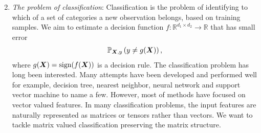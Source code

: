 \documentclass[12pt]{article}
\begin{document}
\begin{enumerate}[label={2.\arabic*}]
\setcounter{enumi}{1}
\item {\it The problem of classification}: Classification is the problem of identifying to which of a set of categories a new observation belongs, based on training samples. We aim to estimate a decision function $f:\mathbb{R}^{d_1\times d_2}\rightarrow \mathbb{R}$ that has small error
\begin{align}
    \mathbb{P}_{\bm X,y}\left(y\neq g(\bm X)\right),
\end{align}
where $g(\bm X) = \text{sign}(f(\bm X))$ is a decision rule. The classification problem has long been interested. Many attempts have been developed and performed well for example, decision tree, nearest neighbor, neural network and support vector machine to name a few. However, most of methods have focused on vector valued features. In many classification problems, the input features are naturally represented as matrices or tensors rather than vectors. 
We want to tackle matrix valued classification preserving the matrix structure.



\end{enumerate}
\end{document}

